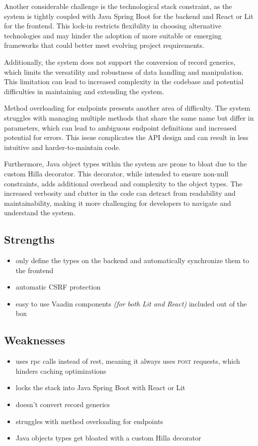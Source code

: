 
Another considerable challenge is the technological stack constraint, as the system is tightly coupled with Java Spring Boot for the backend and React or Lit for the frontend. This lock-in restricts flexibility in choosing alternative technologies and may hinder the adoption of more suitable or emerging frameworks that could better meet evolving project requirements.

Additionally, the system does not support the conversion of record generics, which limits the versatility and robustness of data handling and manipulation. This limitation can lead to increased complexity in the codebase and potential difficulties in maintaining and extending the system.

Method overloading for endpoints presents another area of difficulty. The system struggles with managing multiple methods that share the same name but differ in parameters, which can lead to ambiguous endpoint definitions and increased potential for errors. This issue complicates the API design and can result in less intuitive and harder-to-maintain code.

Furthermore, Java object types within the system are prone to bloat due to the custom Hilla  decorator. This decorator, while intended to ensure non-null constraints, adds additional overhead and complexity to the object types. The increased verbosity and clutter in the code can detract from readability and maintainability, making it more challenging for developers to navigate and understand the system.


\subsection{Strengths}
\label{subsec:hilla:strengths}
\begin{itemize}
    \item only define the types on the backend and automatically synchronize them to the frontend
    \item automatic CSRF protection
    \item easy to use Vaadin components \textit{(for both Lit and React)} included out of the box
\end{itemize}

\subsection{Weaknesses}
\label{subsec:hilla:weaknesses}
\begin{itemize}
    \item uses \acrshort{rpc} calls instead of \acrshort{rest}, meaning it always uses \textsc{post} requests, which hinders caching optimizations
    \item locks the stack into Java Spring Boot with React or Lit
    \item doesn't convert record generics
    \item struggles with method overloading for endpoints
    \item Java objects types get bloated with a custom Hilla  decorator
\end{itemize}

